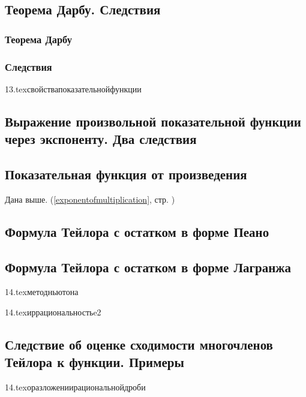 \subsection{Теорема Дарбу. Следствия}
\subsubsection{Теорема Дарбу}
\subsubsection{Следствия}

{13.tex}{свойствапоказательнойфункции}

\subsection{Выражение произвольной показательной функции через экспоненту. Два следствия}

\subsection{Показательная функция от произведения}
Дана выше. (\ref{exponentofmultiplication}, стр. \pageref{exponentofmultiplication})

\subsection{Формула Тейлора с остатком в форме Пеано}

\subsection{\teormin Формула Тейлора с остатком в форме Лагранжа}

{14.tex}{методньютона}

{14.tex}{иррациональностьe2}

\subsection{Следствие об оценке сходимости многочленов Тейлора к функции. Примеры}

{14.tex}{оразложениирациональнойдроби}

